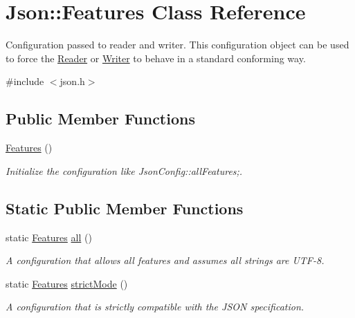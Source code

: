 \hypertarget{class_json_1_1_features}{}\section{Json\+:\+:Features Class Reference}
\label{class_json_1_1_features}


Configuration passed to reader and writer. This configuration object can be used to force the \hyperlink{class_json_1_1_reader}{Reader} or \hyperlink{class_json_1_1_writer}{Writer} to behave in a standard conforming way.  




{\ttfamily \#include $<$json.\+h$>$}

\subsection*{Public Member Functions}
\begin{DoxyCompactItemize}
\item 
\hyperlink{class_json_1_1_features_ad15a091cb61bb31323299a95970d2644}{Features} ()\hypertarget{class_json_1_1_features_ad15a091cb61bb31323299a95970d2644}{}\label{class_json_1_1_features_ad15a091cb61bb31323299a95970d2644}

\begin{DoxyCompactList}\small\item\em Initialize the configuration like Json\+Config\+::all\+Features;. \end{DoxyCompactList}\end{DoxyCompactItemize}
\subsection*{Static Public Member Functions}
\begin{DoxyCompactItemize}
\item 
static \hyperlink{class_json_1_1_features}{Features} \hyperlink{class_json_1_1_features_a63894da6e2c100b38741fa933f3d33ae}{all} ()
\begin{DoxyCompactList}\small\item\em A configuration that allows all features and assumes all strings are U\+T\+F-\/8. \end{DoxyCompactList}\item 
static \hyperlink{class_json_1_1_features}{Features} \hyperlink{class_json_1_1_features_ae23176c14b2e79e81fb61fb1a8ab58ee}{strict\+Mode} ()
\begin{DoxyCompactList}\small\item\em A configuration that is strictly compatible with the J\+S\+ON specification. \end{DoxyCompactList}\end{DoxyCompactItemize}
